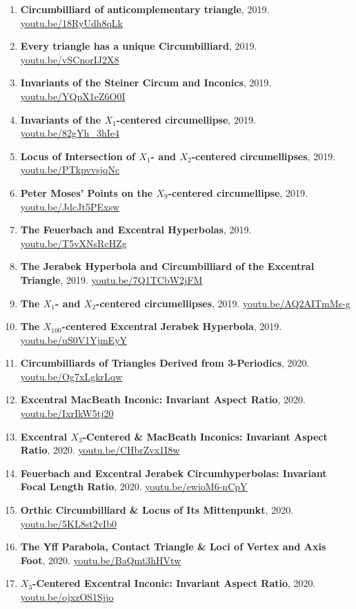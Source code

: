 \documentclass[12pt]{article}
\begin{document}
\begin{enumerate}[resume]
\item \textbf{Circumbilliard of anticomplementary triangle}, 2019. \href{https://youtu.be/18RyUdh8qLk}{\url{youtu.be/18RyUdh8qLk}}
\item \textbf{Every triangle has a unique Circumbilliard}, 2019. \href{https://youtu.be/vSCnorIJ2X8}{\url{youtu.be/vSCnorIJ2X8}}
\item \textbf{Invariants of the Steiner Circum and Inconics}, 2019. \href{https://youtu.be/YQpX1eZ6O0I}{\url{youtu.be/YQpX1eZ6O0I}}
\item \textbf{Invariants of the $X_{1}$-centered circumellipse}, 2019. \href{https://youtu.be/82gYh_3hIe4}{\url{youtu.be/82gYh\_3hIe4}}
\item \textbf{Locus of Intersection of $X_{1}$- and $X_{2}$-centered circumellipses}, 2019. \href{https://youtu.be/PTkpvvsjqNc}{\url{youtu.be/PTkpvvsjqNc}}
\item \textbf{Peter Moses' Points on the $X_{9}$-centered circumellipse}, 2019. \href{https://youtu.be/JdcJt5PExsw}{\url{youtu.be/JdcJt5PExsw}}
\item \textbf{The Feuerbach and Excentral Hyperbolas}, 2019. \href{https://youtu.be/T5vXNsRcHZg}{\url{youtu.be/T5vXNsRcHZg}}
\item \textbf{The Jerabek Hyperbola and Circumbilliard of the Excentral Triangle}, 2019. \href{https://youtu.be/7Q1TCbW2jFM}{\url{youtu.be/7Q1TCbW2jFM}}
\item \textbf{The $X_{1}$- and $X_{2}$-centered circumellipses}, 2019. \href{https://youtu.be/AQ2AITmMs-g}{\url{youtu.be/AQ2AITmMs-g}}
\item \textbf{The $X_{100}$-centered Excentral Jerabek Hyperbola}, 2019. \href{https://youtu.be/uS0V1YjmEyY}{\url{youtu.be/uS0V1YjmEyY}}
\item \textbf{Circumbilliards of Triangles Derived from 3-Periodics}, 2020. \href{https://youtu.be/Og7xLgkrLqw}{\url{youtu.be/Og7xLgkrLqw}}
\item \textbf{Excentral MacBeath Inconic: Invariant Aspect Ratio}, 2020. \href{https://youtu.be/IxrIkW5tj20}{\url{youtu.be/IxrIkW5tj20}}
\item \textbf{Excentral $X_{3}$-Centered \& MacBeath Inconics: Invariant Aspect Ratio}, 2020. \href{https://youtu.be/CHbrZvx1I8w}{\url{youtu.be/CHbrZvx1I8w}}
\item \textbf{Feuerbach and Excentral Jerabek Circumhyperbolas: Invariant Focal Length Ratio}, 2020. \href{https://youtu.be/ewioM6-nCpY}{\url{youtu.be/ewioM6-nCpY}}
\item \textbf{Orthic Circumbilliard \& Locus of Its Mittenpunkt}, 2020. \href{https://youtu.be/5KL8st2vIb0}{\url{youtu.be/5KL8st2vIb0}}
\item \textbf{The Yff Parabola, Contact Triangle \& Loci of Vertex and Axis Foot}, 2020. \href{https://youtu.be/BaQmt3hHVtw}{\url{youtu.be/BaQmt3hHVtw}}
\item \textbf{$X_{3}$-Centered Excentral Inconic: Invariant Aspect Ratio}, 2020. \href{https://youtu.be/ojxzOS1Sjjo}{\url{youtu.be/ojxzOS1Sjjo}}
\end{enumerate}
\end{document}
